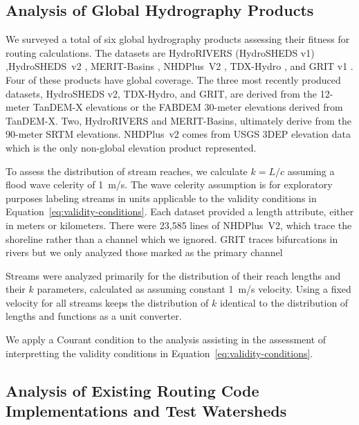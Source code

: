 \subsection{Analysis of Global Hydrography Products}
\label{subsec:analysis-hydrography-products}

We surveyed a total of six global hydrography products assessing their fitness for routing calculations. The datasets are HydroRIVERS (HydroSHEDS v1)
\citep{lehner2013},HydroSHEDS~v2 \citep{lehner2022, lehner2026}, MERIT-Basins \citep{lin2019}, NHDPlus~V2 \citep{mckay2012}, TDX-Hydro
\citep{carlson2024}, and GRIT v1 \citep{wortmann_grit, wortmann2025}. Four of these products have global coverage. The three most recently produced
datasets, HydroSHEDS v2, TDX-Hydro, and GRIT, are derived from the 12-meter TanDEM-X elevations or the FABDEM 30-meter elevations derived from
TanDEM-X. Two, HydroRIVERS and MERIT-Basins, ultimately derive from the 90-meter SRTM elevations. NHDPlus~v2 comes from USGS 3DEP elevation data which
is the only non-global elevation product represented.

To assess the distribution of stream reaches, we calculate $k = L / c$ assuming a flood wave celerity of 1~m/s.
The wave celerity assumption is for exploratory purposes labeling streams in units applicable to the validity conditions in Equation~\ref{eq:validity-conditions}.
Each dataset provided a length attribute, either in meters or kilometers.
There were 23,585 lines of NHDPlus~V2, which trace the shoreline rather than a channel which we ignored.
GRIT traces bifurcations in rivers but we only analyzed those marked as the primary channel

Streams were analyzed primarily for the distribution of their reach lengths and their $k$ parameters, calculated as assuming
constant 1~m/s velocity. Using a fixed velocity for all streams keeps the distribution of $k$ identical to the distribution of lengths and functions
as a unit converter.

We apply a Courant condition to the analysis assisting in the assessment of interpretting the validity conditions in Equation~\ref{eq:validity-conditions}.

\subsection{Analysis of Existing Routing Code Implementations and Test Watersheds}
\label{subsec:analysis-of-routing-code}

